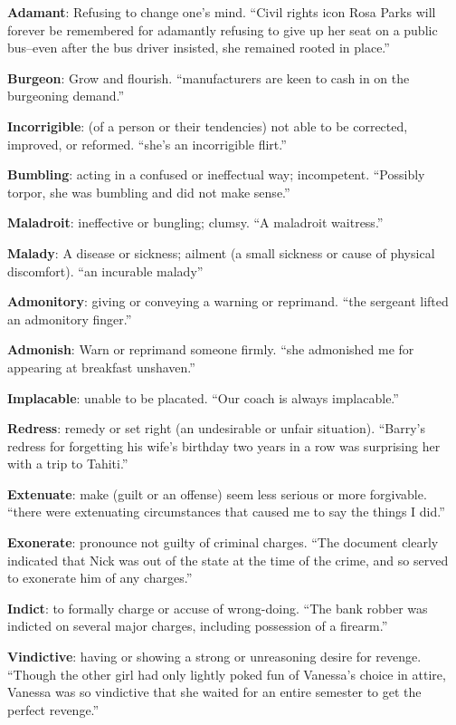 \documentclass[12pt, a4paper]{ximera}
\begin{document}
\textbf{Adamant}: Refusing to change one's mind. ``Civil rights icon Rosa Parks will forever be remembered for adamantly refusing to give up her seat on a public bus--even after the bus driver insisted, she remained rooted in place.''

\textbf{Burgeon}: Grow and flourish. ``manufacturers are keen to cash in on the burgeoning demand.'' 

\textbf{Incorrigible}: (of a person or their tendencies) not able to be corrected, improved, or reformed. ``she's an incorrigible flirt.''

\textbf{Bumbling}: acting in a confused or ineffectual way; incompetent. ``Possibly torpor, she was bumbling and did not make sense.''

\textbf{Maladroit}: ineffective or bungling; clumsy. ``A maladroit waitress.''

\textbf{Malady}: A disease or sickness; ailment (a small sickness or cause of physical discomfort). ``an incurable malady''

\textbf{Admonitory}: giving or conveying a warning or reprimand. ``the sergeant lifted an admonitory finger.''

\textbf{Admonish}: Warn or reprimand someone firmly. ``she admonished me for appearing at breakfast unshaven.''

\textbf{Implacable}: unable to be placated. ``Our coach is always implacable.''

\textbf{Redress}: remedy or set right (an undesirable or unfair situation). ``Barry's redress for forgetting his wife's birthday two years in a row was surprising her with a trip to Tahiti.''

\textbf{Extenuate}: make (guilt or an offense) seem less serious or more forgivable. ``there were extenuating circumstances that caused me to say the things I did.''

\textbf{Exonerate}: pronounce not guilty of criminal charges. ``The document clearly indicated that Nick was out of the state at the time of the crime, and so served to exonerate him of any charges.''

\textbf{Indict}: to formally charge or accuse of wrong-doing. ``The bank robber was indicted on several major charges, including possession of a firearm.''

\textbf{Vindictive}: having or showing a strong or unreasoning desire for revenge. ``Though the other girl had only lightly poked fun of Vanessa's choice in attire, Vanessa was so vindictive that she waited for an entire semester to get the perfect revenge.''
\end{document}
